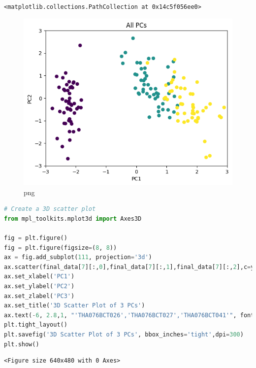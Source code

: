 \documentclass[
]{article}
\begin{document}
\begin{lstlisting}
<matplotlib.collections.PathCollection at 0x14c5f056ee0>
\end{lstlisting}

\begin{figure}
\centering
\includegraphics{PCA on IRIS_files/PCA on IRIS_54_1.png}
\caption{png}
\end{figure}

\begin{lstlisting}[language=Python]
# Create a 3D scatter plot
from mpl_toolkits.mplot3d import Axes3D

fig = plt.figure()
fig = plt.figure(figsize=(8, 8))
ax = fig.add_subplot(111, projection='3d')
ax.scatter(final_data[7][:,0],final_data[7][:,1],final_data[7][:,2],c=y, marker='o')
ax.set_xlabel('PC1')
ax.set_ylabel('PC2')
ax.set_zlabel('PC3')
ax.set_title('3D Scatter Plot of 3 PCs')
ax.text(-6, 2.8,1, "'THA076BCT026','THA076BCT027','THA076BCT041'", fontsize=8,color='red')
plt.tight_layout()
plt.savefig('3D Scatter Plot of 3 PCs', bbox_inches='tight',dpi=300)
plt.show()
\end{lstlisting}

\begin{lstlisting}
<Figure size 640x480 with 0 Axes>
\end{lstlisting}
\end{document}
